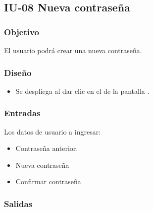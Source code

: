 \newpage
\subsection{IU-08 Nueva contraseña}

\subsubsection{Objetivo}
	El usuario podrá crear una nueva contraseña.
\subsubsection{Diseño}
	\begin{itemize}
		\item Se despliega al dar clic en el  de la pantalla .
\end{itemize}		


\subsubsection{Entradas}
Los datos de usuario a ingresar:
\begin{itemize}
	\item Contraseña anterior.
	\item Nueva contraseña
	\item Confirmar contraseña
\end{itemize}

\subsubsection{Salidas}
\begin{Citemize}
	\item {}
	\item {}
	\item {}
	\item {}
\end{Citemize}
